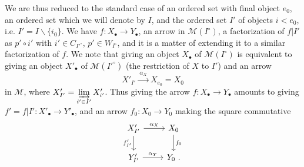 \documentclass[11pt]{article}
\newcommand{\printedpage}[1]{\marginpar{\footnotesize p.~#1}}
\newcommand{\msp}[1]{\marginpar{\footnotesize [#1]}}
\begin{document}
We are thus reduced to the standard case of an ordered set with final object $e_0$, an ordered set which we will denote by $I$, and the ordered set $I'$ of objects $i<e_0$, i.e. $I'=I\backslash\{i_0\}$. %
We have $f:X_\bullet\longrightarrow Y_\bullet$, an arrow in $\mathcal{M}(I^\circ)$, a factorization of $f|I'$ as $p'\circ i'$ with $i'\in C_{I'^\circ}$, $p'\in W_{I^\circ}$, %
\msp{47}
and it is a matter of extending it to a similar factorization of $f$. We note that giving an object $X_\bullet$ of $\mathcal{M}(I^\circ)$ is equivalent to giving an object $X'_\bullet$ of $\mathcal{M}(I'^\circ)$ (the restriction of $X$ to $I'$) and an arrow
\[
X'_{I'} \xrightarrow{\ \alpha_X\ } X_{e_0}=X_0
\]
in $\mathcal{M}$, where $X'_{I'}=\varinjlim\limits_{i'\in I'}X'_{i'}$. Thus giving the arrow $f:X_\bullet\longrightarrow Y_\bullet$ amounts to giving $f'=f|I':X'_\bullet\longrightarrow Y'_\bullet$, and an arrow $f_0:X_0\longrightarrow Y_0$ making the square commutative
\printedpage{25}
\[
\begin{tikzcd}
X'_{I'} \arrow[r, "\alpha_X"] \arrow[d, "f'_{I'}"'] & X_0 \arrow[d, "f_0"] \\
Y'_{I'} \arrow[r, "\alpha_Y"] & Y_0\ .
\end{tikzcd}
\]
\end{document}
